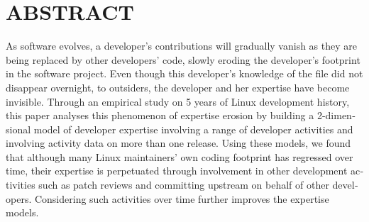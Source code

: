 %

\chapter*{ABSTRACT}\thispagestyle{headings}
%
\begin{otherlanguage}{english}



As software evolves, a developer's contributions will gradually vanish as they are being replaced by other developers' code, slowly eroding the developer's footprint in the software project. Even though this developer's knowledge of the file did not disappear overnight, to outsiders, the developer and her expertise have become invisible. Through an empirical study on 5 years of Linux development history, this paper analyses this phenomenon of expertise erosion by building a 2-dimensional model of developer expertise involving a range of developer activities and involving activity data on more than one release. Using these models, we found that although many Linux maintainers' own coding footprint has regressed over time, their expertise is perpetuated through involvement in other development activities such as patch reviews and committing upstream on behalf of other developers. Considering such activities over time further improves the expertise models.

\end{otherlanguage}

